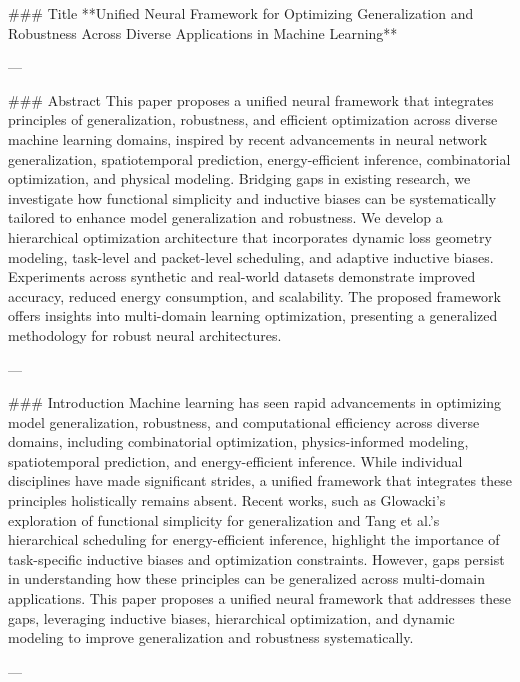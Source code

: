 ### Title  
**Unified Neural Framework for Optimizing Generalization and Robustness Across Diverse Applications in Machine Learning**

---

### Abstract  
This paper proposes a unified neural framework that integrates principles of generalization, robustness, and efficient optimization across diverse machine learning domains, inspired by recent advancements in neural network generalization, spatiotemporal prediction, energy-efficient inference, combinatorial optimization, and physical modeling. Bridging gaps in existing research, we investigate how functional simplicity and inductive biases can be systematically tailored to enhance model generalization and robustness. We develop a hierarchical optimization architecture that incorporates dynamic loss geometry modeling, task-level and packet-level scheduling, and adaptive inductive biases. Experiments across synthetic and real-world datasets demonstrate improved accuracy, reduced energy consumption, and scalability. The proposed framework offers insights into multi-domain learning optimization, presenting a generalized methodology for robust neural architectures.

---

### Introduction  
Machine learning has seen rapid advancements in optimizing model generalization, robustness, and computational efficiency across diverse domains, including combinatorial optimization, physics-informed modeling, spatiotemporal prediction, and energy-efficient inference. While individual disciplines have made significant strides, a unified framework that integrates these principles holistically remains absent. Recent works, such as Glowacki’s exploration of functional simplicity for generalization and Tang et al.’s hierarchical scheduling for energy-efficient inference, highlight the importance of task-specific inductive biases and optimization constraints. However, gaps persist in understanding how these principles can be generalized across multi-domain applications. This paper proposes a unified neural framework that addresses these gaps, leveraging inductive biases, hierarchical optimization, and dynamic modeling to improve generalization and robustness systematically.

---

